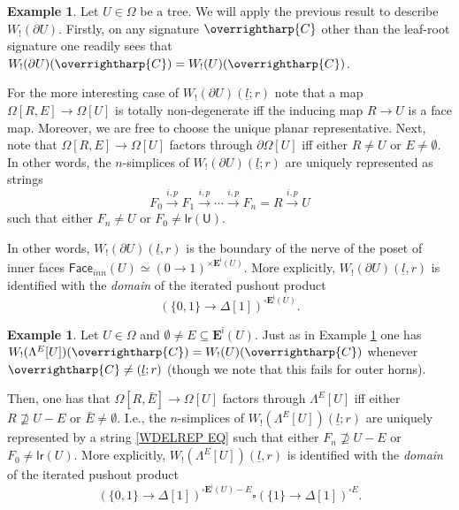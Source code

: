 \documentclass[a4paper,10pt
,draft
]{article}%
\numberwithin{equation}{section}
\numberwithin{figure}{section}
\theoremstyle{definition} %
\newtheorem{example}[equation]{Example}%
\newcommand{\vect}[1]{\text{\overrightharp{\ensuremath{#1}}}}
\newcommand{\1}{\ensuremath{\mathbbm 1}}%
\begin{document}
\begin{example}\label{WPARTIALT_EX}
      Let $U \in \Omega$ be a tree.
      We will apply the previous result to describe
      $W_!(\partial U)$.
      Firstly, 
      on any signature $\vect{C}$
      other than the leaf-root signature
      one readily sees that
      $W_!(\partial U)(\vect{C}) = W_!(U)(\vect{C})$.

	For the more interesting case of 
	$W_!(\partial U)(\underline{l};r)$
	note that a map
	$\Omega[R,E] \to \Omega [U]$
	is totally non-degenerate iff
	the inducing map $R \to U$
	is a face map. Moreover, we are free to choose the unique planar representative.
	Next, note that 
	$\Omega[R,E] \to \Omega [U]$
	factors through $\partial \Omega[U]$
	iff either $R \neq U$ or $E \neq \emptyset$.
	In other words, the $n$-simplices of 
	$W_!(\partial U)(\underline{l};r)$
	are uniquely represented as strings
\begin{equation}\label{WDELREP EQ}
	F_0 \xrightarrow{i,p} 
	F_1 \xrightarrow{i,p} 
	\cdots \xrightarrow{i,p}
	F_n = R \xrightarrow{i,p} U
\end{equation}
	such that either $F_n \neq U$ or $F_0 \neq \mathsf{lr(U)}$.

In other words, 
$W_!(\partial U)(\underline{l},r)$
is the boundary of the nerve of the poset of inner faces
$\mathsf{Face}_{inn}(U) \simeq 
(0 \to 1)^{\times \boldsymbol{E}^{\mathsf{i}}(U)}$.
More explicitly, 
$W_!(\partial U)(\underline{l},r)$ 
is identified with the \emph{domain} of the iterated pushout product
\[
	\left(
	\{0,1\} \to \Delta[1]
	\right)^{\square \boldsymbol{E}^{\mathsf{i}}(U)}.
\]
\end{example}




\begin{example}\label{WPARTIALT2_EX}
	Let $U\in \Omega$ and 
	$\emptyset \neq E \subseteq \boldsymbol{E}^{\mathsf{i}}(U)$.
	Just as in Example \ref{WPARTIALT_EX}
	one has 
	$W_!(\Lambda^E[U])(\vect{C}) = W_!(U)(\vect{C})$
	whenever $\vect{C} \neq (\underline{l};r)$
	(though we note that this fails for outer horns).
	
	Then, one has that 
	$\Omega[R,\bar{E}] \to \Omega[U]$
	factors through $\Lambda^E[U]$
	iff either $R \not \supseteq U-E$ or $\bar{E}\neq \emptyset$.
	I.e., the $n$-simplices of
	$W_!(\Lambda^E[U])(\underline{l};r)$ 
	are uniquely represented by a string
	\eqref{WDELREP EQ}
	such that either $F_n \not \supseteq U-E$
	or $F_0 \neq \mathsf{lr}(U)$. 
	More explicitly, 
	$W_!(\Lambda^E[U])(\underline{l},r)$ 
	is identified with the \emph{domain} of the iterated pushout product
	\[
	\left(
	\{0,1\} \to \Delta[1]
	\right)^{\square \boldsymbol{E}^{\mathsf{i}}(U)-E}
	\square
	\left(
	\{1\} \to \Delta[1]
	\right)^{\square E}.
	\]
\end{example}
\end{document}
